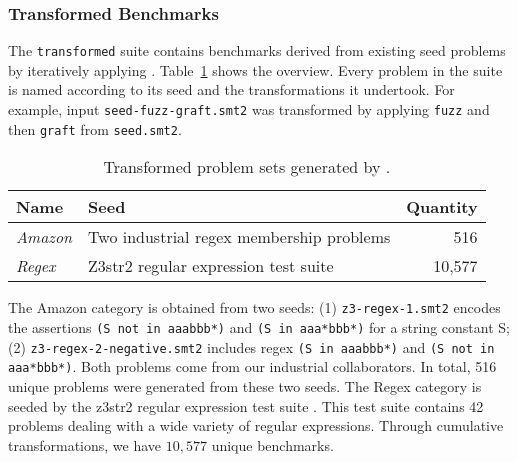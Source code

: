 \subsubsection{Transformed Benchmarks}

The \texttt{transformed}
suite contains benchmarks derived from existing seed problems by
iteratively applying \transformer{}. Table~\ref{tbl:transformed} shows
the overview. Every problem in the suite is named according to its
seed and the transformations it undertook. For example, input
\texttt{seed-fuzz-graft.smt2} was transformed by applying
\texttt{fuzz} and then \texttt{graft} from \texttt{seed.smt2}.
\begin{table}[H]
    \centering
    \caption{Transformed problem sets generated by \transformer{}.}
    \label{tbl:transformed}
    \begin{tabular}{|l|l|r|}
        \hline
        \textbf{Name}   & \textbf{Seed}                            & \textbf{Quantity} \\ \hline
        \textit{Amazon} & Two industrial regex membership problems & 516\\ \hline
        \textit{Regex}  & Z3str2 regular expression test suite     & 10,577\\ \hline
    \end{tabular}
\end{table}

The Amazon category is obtained from two seeds: (1)
\texttt{z3-regex-1.smt2} encodes the assertions \texttt{(S not in
  aaabbb*)} and \texttt{(S in aaa*bbb*)} for a string constant S; (2)
\texttt{z3-regex-2-negative.smt2} includes regex \texttt{(S in
  aaabbb*)} and \texttt{(S not in aaa*bbb*)}.  Both problems come from
our industrial collaborators. In total, 516 unique problems were
generated from these two seeds. The Regex category is seeded by the
z3str2 regular expression test suite \cite{z3str2-tests}.  This test
suite contains 42 problems dealing with a wide variety of regular
expressions.  Through cumulative transformations, we have $10,577$
unique benchmarks.
